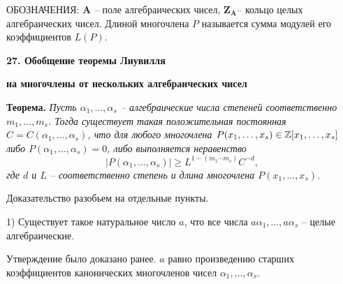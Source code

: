 
%

ОБОЗНАЧЕНИЯ: $\mathbf A$ -- поле алгебраических чисел, $\mathbf
Z_{\mathbf A}$-- кольцо целых алгебраических чисел. Длиной
многочлена $P$ называется сумма модулей его коэффициентов $L(P)$.


\vskip 10mm \centerline{\bf {27. Обобщение теоремы Лиувилля}  }
\centerline{\bf {на многочлены от нескольких алгебраических чисел}
} \vskip 5mm


{\bf Теорема.} {\it Пусть $\alpha_1, \dots, \alpha_s$ --
алгебраические числа степеней соответственно $m_1, \dots, m_s$.
Тогда существует такая положительная постоянная $C=C(\alpha_1,
\dots, \alpha_s)$, что для любого многочлена $P(x_1, \dots, x_s)
\in \Bbb Z[x_1, \dots, x_s]$ либо $P(\alpha_1, \dots,
\alpha_s)=0$, либо выполняется неравенство
\begin{equation}\label{1}
|P(\alpha_1, \dots, \alpha_s)| \ge L^{1-(m_1 \cdots m_s)} C^{-d},
\end{equation}
 где $d$   и $L$  -- соответственно степень и длина
многочлена $P(x_1, \dots, x_s)$.}

\vskip 5mm

Доказательство разобьем на отдельные пункты. \vskip 5mm

1) Существует такое натуральное число $a$, что все числа $a
\alpha_1, \dots, a \alpha_s$ -- целые алгебраические.

Утверждение было доказано ранее. $a$ равно произведению старших
коэффициентов канонических многочленов чисел $\alpha_1, \dots,
\alpha_s$. \vskip 5mm

